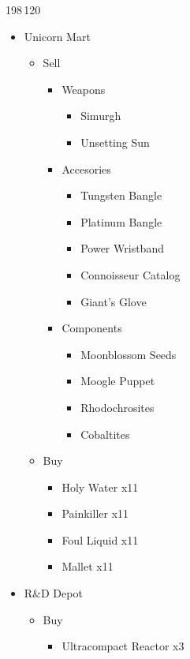 \begin{shop}{198\,120}
	\begin{itemize}
		\item Unicorn Mart
			\begin{itemize}
				\item Sell
					\begin{itemize}
						\item Weapons
							\begin{itemize}
								\item Simurgh
								\item Unsetting Sun
							\end{itemize}
						\item Accesories
							\begin{itemize}
								\item Tungsten Bangle
								\item Platinum Bangle
								\item Power Wristband
								\item Connoisseur Catalog
								\item Giant's Glove
							\end{itemize}
						\item Components
							\begin{itemize}
								\item Moonblossom Seeds
								\item Moogle Puppet
								\item Rhodochrosites
								\item Cobaltites
							\end{itemize}
					\end{itemize}
				\item Buy
					\begin{itemize}
						\item Holy Water x11
						\item Painkiller x11
						\item Foul Liquid x11
						\item Mallet x11
					\end{itemize}
			\end{itemize}
		\item R\&D Depot
			\begin{itemize}
				\item Buy
					\begin{itemize}
						\item Ultracompact Reactor x3
					\end{itemize}
			\end{itemize}

\end{itemize}
\end{shop}
